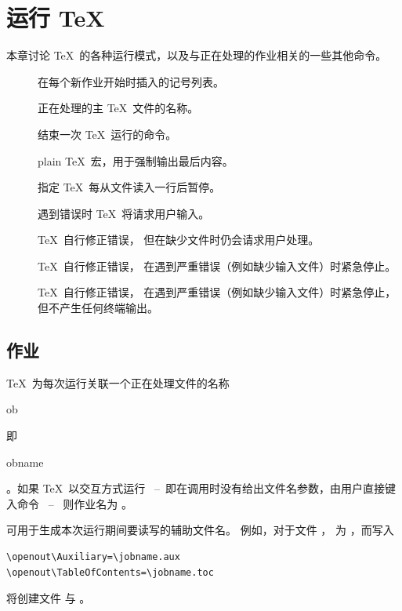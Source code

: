 \documentclass[a4paper]{rapport3}
\makeatletter
\def\ldash{\unskip\ --\nobreak\ \ignorespaces}
\def\rdash{\unskip\nobreak\ --\ \ignorespaces}
\newenvironment{inventory}{\begin{description}}{\end{description}}
\def\term#1\par{\index{#1}}
\def\cstoidx#1\par{\index{#1@\cs{#1}}}
\def\csidx#1{\cstoidx #1\par\cs{#1}}
\makeatother
\begin{document}
\endofchapter
\chapter{运行 \TeX}\label{run}

本章讨论 \TeX\ 的各种运行模式，以及与正在处理的作业相关的一些其他命令。

\begin{inventory}
\item [] 
      在每个新作业开始时插入的记号列表。

\item [] 
      正在处理的主 \TeX\ 文件的名称。

\item [] 
      结束一次 \TeX\ 运行的命令。

\item []
      plain \TeX\ 宏，用于强制输出最后内容。

\item [] 
      指定 \TeX\ 每从文件读入一行后暂停。

\item []
      遇到错误时 \TeX\ 将请求用户输入。

\item [] 
      \TeX\ 自行修正错误，
      但在缺少文件时仍会请求用户处理。

\item [] 
      \TeX\ 自行修正错误，
      在遇到严重错误（例如缺少输入文件）时紧急停止。

\item [] 
      \TeX\ 自行修正错误，
      在遇到严重错误（例如缺少输入文件）时紧急停止，
      但不产生任何终端输出。

\end{inventory}

\section{作业}

\TeX\ 为每次运行关联一个正在处理文件的名称
\term job\par
即 \csidx{jobname}。如果 \TeX\ 以交互方式运行
\ldash 即在调用时没有给出文件名参数，由用户直接键入命令 \rdash
则作业名为 。

 可用于生成本次运行期间要读写的辅助文件名。
例如，对于文件 ，
 为 ，而写入
\begin{verbatim}
\openout\Auxiliary=\jobname.aux
\openout\TableOfContents=\jobname.toc
\end{verbatim}
将创建文件  与 。
\end{document}
